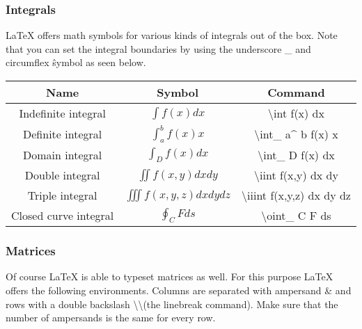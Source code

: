 \subsubsection{Integrals}
LaTeX offers math symbols for various kinds of integrals out of the box.
Note that you can set the integral boundaries by using the underscore \_ and 
circumflex \^ symbol as seen below.

\begin{center}
\begin{tabular}{ccc}
\toprule  %
Name&	Symbol&	Command\\
\midrule  %
Indefinite integral & $\int f(x) dx$ & \textbackslash int f(x) dx \\
Definite integral & $\int_a^b f(x) x$ & \textbackslash int\_{} a\^{} b f(x) x \\
Domain integral &  $\int_D f(x) dx$ & \textbackslash int\_{} D f(x) dx \\
Double integral & $\iint f(x,y) dx dy$ & \textbackslash iint f(x,y) dx dy \\
Triple integral & $\iiint f(x,y,z) dx dy dz$ & \textbackslash iiint f(x,y,z) dx dy dz \\
Closed curve integral & $\oint_C F ds$ & \textbackslash oint\_{} C F ds \\
\bottomrule %
\end{tabular}
\end{center}



\subsubsection{Matrices}
Of course LaTeX is able to typeset matrices as well. 
For this purpose LaTeX offers the following environments. 
Columns are separated with ampersand \& and rows with a double backslash \textbackslash\textbackslash (the linebreak command). Make sure that the number of ampersands is the same for every row.

